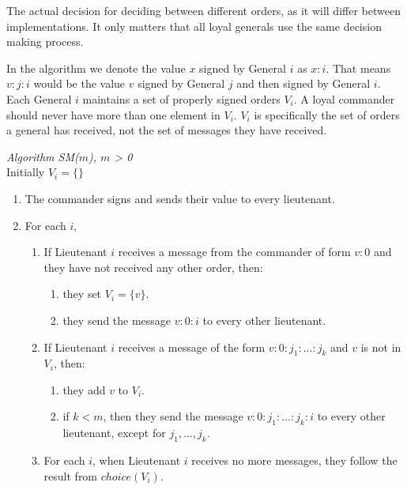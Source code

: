 \documentclass[10pt]{amsart}
\begin{document}
\noindent The actual decision for deciding between different orders, as it will differ between
implementations. It only matters that all loyal generals use the same decision making process.

In the algorithm we denote the value $x$ signed by General $i$ as $x:i$. That means $v:j:i$ would be the 
value $v$ signed by General $j$ and then signed by General $i$. Each General $i$ maintains a set of properly
signed orders $V_i$. A loyal commander should never have more than one element in $V_i$. $V_i$ is specifically
the set of orders a general has received, not the set of messages they have received.

\noindent\emph{Algorithm SM($m$), $m$ > 0} \\
Initially $V_i=\{\}$
\vspace{-10pt}
\begin{enumerate}[label=\arabic{enumi}.]
    \item The commander signs and sends their value to every lieutenant.
    \item For each $i$,
    \begin{enumerate}[label={\alph*.}]
        \item {
            If Lieutenant $i$ receives a message from the commander of form $v:0$ and they have not received
            any other order, then:
            \begin{enumerate}[label=\roman*.]
                \item they set $V_i=\{v\}$.
                \item they send the message $v:0:i$ to every other lieutenant.
            \end{enumerate}
        }
        \item {
            If Lieutenant $i$ receives a message of the form $v:0:j_1:...:j_k$ and $v$ is not in $V_i$, 
            then:
            \begin{enumerate}[label=\roman*.]
                \item they add $v$ to $V_i$.
                \item {
                    if $k < m$, then they send the message $v:0:j_1:...:j_k:i$ to every other lieutenant,
                    except for $j_1,...,j_k$.
                }
            \end{enumerate}
        }
        \item {
            For each $i$, when Lieutenant $i$ receives no more messages, they follow the result from 
            $choice(V_i)$.
        }
    \end{enumerate}
    
\end{enumerate}
\end{document}

